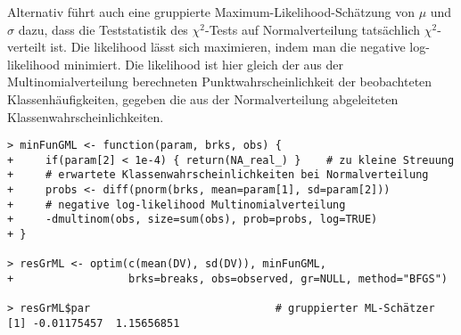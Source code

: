 Alternativ führt auch eine gruppierte Maximum-Likelihood-Schätzung von $\mu$ und $\sigma$ dazu, dass die Teststatistik des $\chi^{2}$-Tests auf Normalverteilung tatsächlich $\chi^{2}$-verteilt ist. Die likelihood lässt sich maximieren, indem man die negative log-likelihood minimiert. Die likelihood ist hier gleich der aus der Multinomialverteilung berechneten Punktwahrscheinlichkeit der beobachteten Klassenhäufigkeiten, gegeben die aus der Normalverteilung abgeleiteten Klassenwahrscheinlichkeiten.
\begin{lstlisting}
> minFunGML <- function(param, brks, obs) {
+     if(param[2] < 1e-4) { return(NA_real_) }    # zu kleine Streuung
+     # erwartete Klassenwahrscheinlichkeiten bei Normalverteilung
+     probs <- diff(pnorm(brks, mean=param[1], sd=param[2]))
+     # negative log-likelihood Multinomialverteilung
+     -dmultinom(obs, size=sum(obs), prob=probs, log=TRUE)
+ }

> resGrML <- optim(c(mean(DV), sd(DV)), minFunGML,
+                  brks=breaks, obs=observed, gr=NULL, method="BFGS")

> resGrML$par                             # gruppierter ML-Schätzer
[1] -0.01175457  1.15656851
\end{lstlisting}
